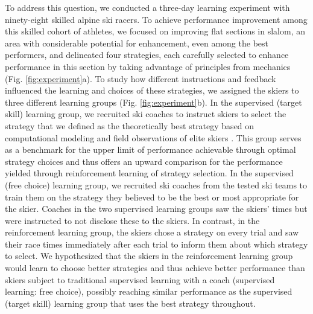 \documentclass[pdflatex,sn-nature]{sn-jnl}%
\theoremstyle{thmstyleone}%
\theoremstyle{thmstyletwo}%
\theoremstyle{thmstylethree}%
\begin{document}
To address this question, we conducted a three-day learning experiment with ninety-eight skilled alpine ski racers. To achieve performance improvement among this skilled cohort of athletes, we focused on improving flat sections in slalom, an area with considerable potential for enhancement, even among the best performers\cite{supej_new_2011}, and delineated four strategies, each carefully selected to enhance performance in this section by taking advantage of principles from mechanics (Fig. \ref{fig:experiment}a). To study how different instructions and feedback influenced the learning and choices of these strategies, we assigned the skiers to three different learning groups   (Fig. \ref{fig:experiment}b). In the supervised (target skill) learning group, we recruited ski coaches to instruct skiers to select the strategy that we defined as the theoretically best strategy based on computational modeling \cite{lind_physics_2013, mote_accelerations_1983, luginbuhl_identification_2023} and field observations of elite skiers \cite{reid_alpine_2020, magelssen_is_2022}. This group serves as a benchmark for the upper limit of performance achievable through optimal strategy choices and thus offers an upward comparison for the performance yielded through reinforcement learning of strategy selection. In the supervised (free choice) learning group, we recruited ski coaches from the tested ski teams to train them on the strategy they believed to be the best or most appropriate for the skier. Coaches in the two supervised learning groups saw the skiers' times but were instructed to not disclose these to the skiers. In contrast, in the reinforcement learning group, the skiers chose a strategy on every trial and saw their race times immediately after each trial to inform them about which strategy to select. We hypothesized that the skiers in the reinforcement learning group would learn to choose better strategies and thus achieve better performance than skiers subject to traditional supervised learning with a coach (supervised learning: free choice), possibly reaching similar performance as the supervised (target skill) learning group that uses the best strategy throughout. 
\end{document}

